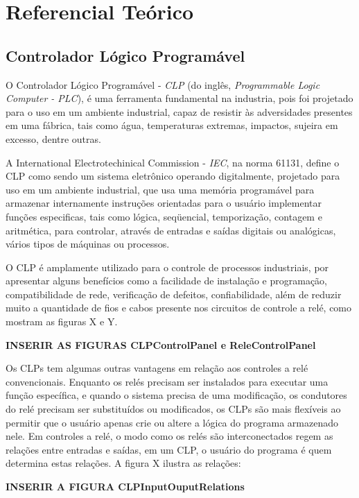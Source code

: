 \documentclass[a4paper, 12pt]{article}
\begin{document}
\section{Referencial Teórico}

	\subsection{Controlador Lógico Programável}
	
		O Controlador Lógico Programável - \textit{CLP} (do inglês, \textit{Programmable Logic Computer - PLC}),
		é uma ferramenta fundamental na industria, pois foi projetado para o uso em um
		ambiente industrial, capaz de resistir às adversidades presentes em uma fábrica,
		tais como água, temperaturas extremas, impactos, sujeira em excesso, dentre outras.
		
		A International Electrotechinical Commission - \textit{IEC}, na norma 61131, define
		o CLP como sendo um sistema eletrônico operando digitalmente, projetado 
		para uso em um ambiente industrial, que usa uma  	memória programável para armazenar
		internamente instruções orientadas para o usuário implementar funções especificas,
		tais como lógica, seqüencial, temporização, contagem e aritmética, para controlar,
		através de entradas e saídas	digitais ou analógicas, vários tipos de máquinas ou 
		processos.
	
		O CLP é amplamente utilizado para o controle de processos industriais, por apresentar
		alguns benefícios como a facilidade de instalação e programação, compatibilidade de rede,
		verificação de defeitos, confiabilidade, além de reduzir muito a quantidade de fios e cabos
		presente nos circuitos de controle a relé, como mostram as figuras X e Y.
	
		\textbf{INSERIR AS FIGURAS CLPControlPanel e ReleControlPanel}
	
		Os CLPs tem algumas outras vantagens em relação aos controles a relé convencionais. Enquanto os relés
		precisam ser instalados para executar uma função específica, e quando o sistema precisa de uma modificação,
		os condutores do relé precisam ser substituídos ou modificados, os CLPs são mais flexíveis ao permitir
		que o usuário apenas crie ou altere a lógica do programa armazenado nele.
		Em controles a relé, o modo como os relés são interconectados regem as relações entre	entradas e saídas,
		em um CLP, o usuário do programa é quem determina estas relações. A figura X ilustra as relações:
	
		\textbf{INSERIR A FIGURA CLPInputOuputRelations}
	
\end{document}

